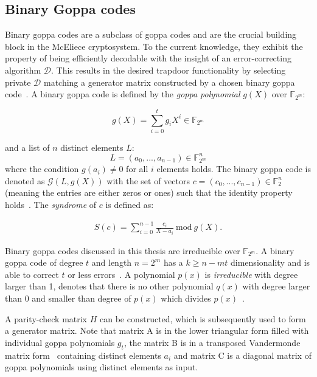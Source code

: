 \documentclass[11pt,
  oneside,openany,    %
]{scrreprt}
\begin{document}
\subsection{Binary Goppa codes}

Binary goppa codes are a subclass of goppa codes and are the crucial building block in the McEliece cryptosystem. To the current knowledge, they exhibit the property of being efficiently decodable with the insight of an error-correcting algorithm $\mathcal{D}$. This results in the desired trapdoor functionality by selecting private $\mathcal{D}$ matching a generator matrix constructed by a chosen binary goppa code~\cite{engelbertOverbeckSchmidt, goppaVD}. A binary goppa code is defined by the \textit{goppa polynomial} $g(X)$ over $\mathbb{F}_{2^{m}}$:

\begin{equation*}
    g(X) = \sum_{i=0}^{t} g_{i}X^{i} \in \mathbb{F}_{2^{m}}
\end{equation*}

and a list of $n$ distinct elements $L$:
\begin{equation*}
    L = (a_{0},...,a_{n-1}) \in \mathbb{F}_{2^{m}}^{n}
\end{equation*}
where the condition $g(a_{i}) \neq 0$ for all $i$ elements holds. The binary goppa code is denoted as $\mathcal{G}(L,g(X))$ with the set of vectors $c = (c_{0},...,c_{n-1}) \in \mathbb{F}_{2}^{n}$ (meaning the entries are either zeros or ones) such that the identity property holds~\cite{engelbertOverbeckSchmidt}. The \textit{syndrome} of $c$ is defined as:

\begin{gather*}
    S(c) = \sum_{i=0}^{n-1} \frac{c_{i}}{X - a_{i}} \ \text{mod} \ g(X). 
\end{gather*}

 Binary goppa codes discussed in this thesis are irreducible over $\mathbb{F}_{2^{m}}$. A binary goppa code of degree $t$ and length $n = 2^{m}$ has a $k \geq n - mt$ dimensionality and is able to correct $t$ or less errors~\cite{robertmceliece}. A polynomial $p(x)$ is \textit{irreducible} with degree larger than 1, denotes that there is no other polynomial $q(x)$ with degree larger than 0 and smaller than degree of $p(x)$ which divides $p(x)$~\cite{mathefuerInfoBand1}.

A parity-check matrix $H$ can be constructed, which is subsequently used to form a generator matrix. Note that matrix A is in the lower triangular form filled with individual goppa polynomials $g_{t}$, the matrix B is in a transposed Vandermonde matrix form~\cite{liesenlineareAlgebra} containing distinct elements $a_{i}$ and matrix C is a diagonal matrix of goppa polynomials using distinct elements as input.
\end{document}
